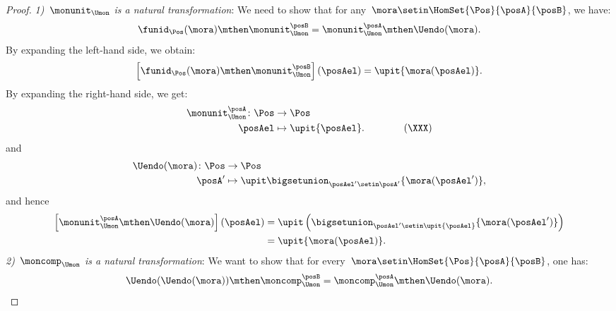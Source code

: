 \begin{proof}
    \emph{1)~$\monunit_{\Umon}$ is a natural transformation}:
    We need to show that for any~$\mora\setin \HomSet{\Pos}{\posA}{\posB}$, we have:
    \begin{equation}
        \funid_{\Pos}(\mora)\mthen \monunit_{\Umon}^\posB=\monunit_{\Umon}^\posA\mthen \Uendo(\mora).
    \end{equation}
    By expanding the left-hand side, we obtain:
    \begin{equation}
        \left[\funid_{\Pos}(\mora)\mthen \monunit_{\Umon}^\posB\right](\posAel)=\upit \{\mora(\posAel)\}.
    \end{equation}
    By expanding the right-hand side, we get:
    \begin{equation}
        \begin{aligned}
            \monunit_{\Umon}^\posA\colon \Pos & \to \Pos \\
            \posAel                           & \mapsto \upit \{\posAel\}.
            \qquad \qquad (\XXX)
        \end{aligned}
    \end{equation}
    and
    \begin{equation}
        \begin{aligned}
            \Uendo(\mora)\colon \Pos & \to \Pos \\
            \posA'                   & \mapsto \upit \bigsetunion_{\posAel'\setin \posA'}\{\mora(\posAel')\},
        \end{aligned}
    \end{equation}
    and hence
    \begin{equation}
        \begin{aligned}
            \left[\monunit_{\Umon}^\posA\mthen \Uendo(\mora)\right](\posAel) & =\upit \left( \bigsetunion_{\posAel'\setin \upit \{\posAel\}} \{\mora(\posAel')\}\right) \\
                                                                             & =\upit \{\mora(\posAel)\}.
        \end{aligned}
    \end{equation}
    \emph{2)~$\moncomp_{\Umon}$ is a natural transformation}:
    We want to show that for every~$\mora\setin \HomSet{\Pos}{\posA}{\posB}$, one has:
    \begin{equation}
        \Uendo(\Uendo(\mora))\mthen \moncomp_{\Umon}^{\posB}=\moncomp_{\Umon}^\posA \mthen \Uendo(\mora).
    \end{equation}

\end{proof}

